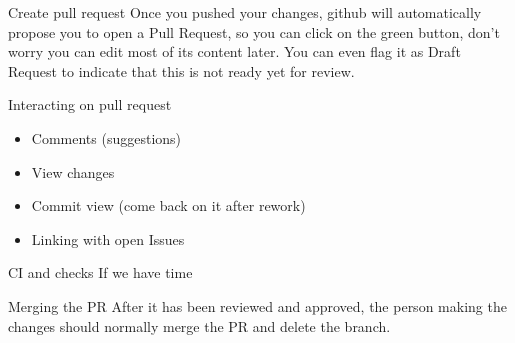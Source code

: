 \documentclass{beamer}
\begin{document}
\begin{frame}{Create pull request}
Once you pushed your changes, github will automatically propose you to open a Pull Request, so you can click on the green button, don't worry you can edit most of its content later. You can even flag it as Draft Request to indicate that this is not ready yet for review.
\end{frame}

\begin{frame}{Interacting on pull request}
\begin{itemize}
 \item Comments (suggestions)
 \item View changes
 \item Commit view (come back on it after rework)
 \item Linking with open Issues
\end{itemize}

\end{frame}


\begin{frame}{CI and checks}
If we have time
\end{frame}

\begin{frame}{Merging the PR}
After it has been reviewed and approved, the person making the changes should normally merge the PR and delete the branch.

\end{frame}
\end{document}
